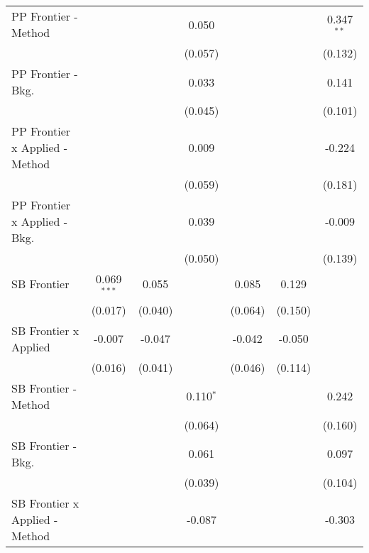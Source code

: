\begin{tabular}{lcccccc}
   PP Frontier - Method           &               &              & 0.050       &              &         & 0.347$^{**}$\\   
                                  &               &              & (0.057)     &              &         & (0.132)\\   
   PP Frontier - Bkg.             &               &              & 0.033       &              &         & 0.141\\   
                                  &               &              & (0.045)     &              &         & (0.101)\\   
   PP Frontier x Applied - Method &               &              & 0.009       &              &         & -0.224\\   
                                  &               &              & (0.059)     &              &         & (0.181)\\   
   PP Frontier x Applied - Bkg.   &               &              & 0.039       &              &         & -0.009\\   
                                  &               &              & (0.050)     &              &         & (0.139)\\   
   SB Frontier                    & 0.069$^{***}$ & 0.055        &             & 0.085        & 0.129   &   \\   
                                  & (0.017)       & (0.040)      &             & (0.064)      & (0.150) &   \\   
   SB Frontier x Applied          & -0.007        & -0.047       &             & -0.042       & -0.050  &   \\   
                                  & (0.016)       & (0.041)      &             & (0.046)      & (0.114) &   \\   
   SB Frontier - Method           &               &              & 0.110$^{*}$ &              &         & 0.242\\   
                                  &               &              & (0.064)     &              &         & (0.160)\\   
   SB Frontier - Bkg.             &               &              & 0.061       &              &         & 0.097\\   
                                  &               &              & (0.039)     &              &         & (0.104)\\   
   SB Frontier x Applied - Method &               &              & -0.087      &              &         & -0.303\\   

\end{tabular}
